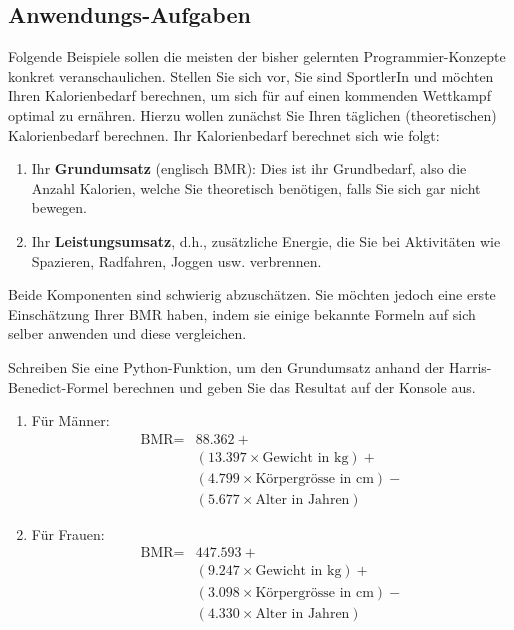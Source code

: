 \subsection{Anwendungs-Aufgaben}

Folgende Beispiele sollen die meisten der bisher gelernten Programmier-Konzepte konkret veranschaulichen. Stellen Sie sich vor, Sie sind SportlerIn und möchten Ihren Kalorienbedarf berechnen, um sich für auf einen kommenden Wettkampf optimal zu ernähren. Hierzu wollen zunächst Sie Ihren täglichen (theoretischen) Kalorienbedarf berechnen. Ihr Kalorienbedarf berechnet sich wie folgt:
\begin{enumerate}
	\item Ihr \textbf{Grundumsatz} (englisch \gls{BMR}): Dies ist ihr Grundbedarf, also die Anzahl Kalorien, welche Sie theoretisch benötigen, falls Sie sich gar nicht bewegen.
	\item Ihr \textbf{Leistungsumsatz}, d.h., zusätzliche Energie, die Sie bei Aktivitäten wie Spazieren, Radfahren, Joggen usw. verbrennen.
\end{enumerate}

Beide Komponenten sind schwierig abzuschätzen. Sie möchten jedoch eine erste Einschätzung Ihrer \gls{BMR} haben, indem sie einige bekannte Formeln auf sich selber anwenden und diese vergleichen.

\begin{myexercise}\label{ex:bmr-simple}
	Schreiben Sie eine Python-Funktion, um den Grundumsatz anhand der Harris-Benedict-Formel berechnen und geben Sie das Resultat auf der Konsole aus.
	\begin{enumerate}
		\item Für Männer:
		      \begin{align*}
			      \text{BMR} = & 88.362 +                                   \\
			                   & (13.397 \times \text{Gewicht in kg}) +     \\
			                   & (4.799 \times \text{Körpergrösse in cm}) - \\
			                   & (5.677 \times \text{Alter in Jahren})
		      \end{align*}
		\item Für Frauen:
		      \begin{align*}
			      \text{BMR} = & 447.593  +                                 \\
			                   & (9.247 \times \text{Gewicht in kg}) +      \\
			                   & (3.098 \times \text{Körpergrösse in cm}) - \\
			                   & (4.330 \times \text{Alter in Jahren})
		      \end{align*}
	\end{enumerate}
	\begin{myanswer}
		
	\end{myanswer}
\end{myexercise}


